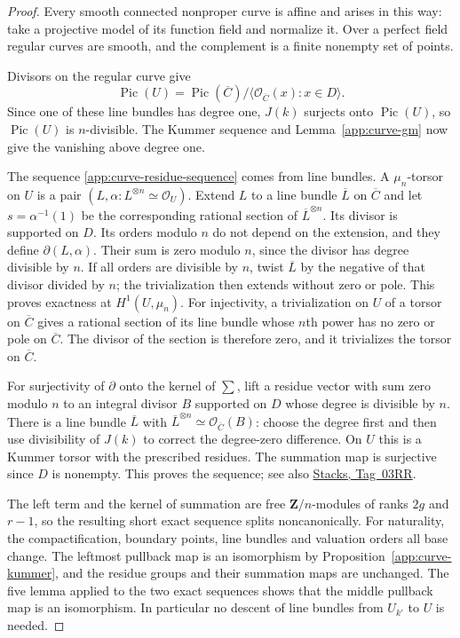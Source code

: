 \documentclass[11pt,a4paper]{article}
\numberwithin{equation}{section}
\theoremstyle{definition}
\theoremstyle{remark}
\newcommand{\stacks}[1]{\href{https://stacks.math.columbia.edu/tag/#1}{\textnormal{Stacks, Tag~#1}}}
\newcommand{\cO}{\mathcal O}
\newcommand{\Z}{\mathbf Z}
\begin{document}
\begin{proof}
Every smooth connected nonproper curve is affine and arises in this
way: take a projective model of its function field and normalize it.
Over a perfect field regular curves are smooth, and the complement is
a finite nonempty set of points.

Divisors on the regular curve give
\[
 \operatorname{Pic}(U)=\operatorname{Pic}(\overline C)/
 \langle\cO_{\overline C}(x):x\in D\rangle.
\]
Since one of these line bundles has degree one, $J(k)$ surjects onto
$\operatorname{Pic}(U)$, so $\operatorname{Pic}(U)$ is $n$-divisible.
The Kummer sequence and Lemma~\ref{app:curve-gm} now give the vanishing
above degree one.

The sequence \eqref{app:curve-residue-sequence} comes from line
bundles.  A $\mu_n$-torsor on $U$ is a pair
$(L,\alpha\colon L^{\otimes n}\simeq\cO_U)$.  Extend $L$ to a line
bundle $\overline L$ on $\overline C$ and let $s=\alpha^{-1}(1)$ be the
corresponding rational section of $\overline L^{\otimes n}$.  Its
divisor is supported on $D$.  Its orders modulo $n$ do not depend on
the extension, and they define $\partial(L,\alpha)$.  Their sum is zero
modulo $n$, since the divisor has degree divisible by $n$.  If all
orders are divisible by $n$, twist $\overline L$ by the negative of
that divisor divided by $n$; the trivialization then extends without
zero or pole.  This proves exactness at $H^1(U,\mu_n)$.  For
injectivity, a trivialization on $U$ of a torsor on $\overline C$
gives a rational section of its line bundle whose $n$th power has no
zero or pole on $\overline C$.  The divisor of the section is
therefore zero, and it trivializes the torsor on $\overline C$.

For surjectivity of $\partial$ onto the kernel of $\sum$, lift a
residue vector with sum zero modulo $n$ to an integral divisor $B$
supported on $D$ whose degree is divisible by $n$.  There is a line
bundle $\overline L$ with $\overline L^{\otimes n}\simeq\cO_{\overline C}(B)$:
choose the degree first and then use divisibility of $J(k)$ to correct
the degree-zero difference.  On $U$ this is a Kummer torsor with the
prescribed residues.  The summation map is surjective since $D$ is
nonempty.  This proves the sequence; see also \stacks{03RR}.

The left term and the kernel of summation are free $\Z/n$-modules of
ranks $2g$ and $r-1$, so the resulting short exact sequence splits
noncanonically.  For naturality, the compactification, boundary
points, line bundles and valuation orders all base change.  The
leftmost pullback map is an isomorphism by
Proposition~\ref{app:curve-kummer}, and the residue groups and their
summation maps are unchanged.  The five lemma applied to the two
exact sequences shows that the middle pullback map is an isomorphism.
In particular no descent of line bundles from $U_{k'}$ to $U$ is
needed.
\end{proof}
\end{document}
